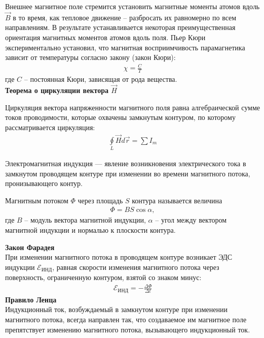 \documentclass[__minimum__.tex]{subfiles}
\begin{document}
Внешнее магнитное поле стремится установить магнитные моменты атомов вдоль $\vec{B}$ в то время, как тепловое движение – разбросать их равномерно по всем направлениям. В результате устанавливается некоторая преимущественная ориентация магнитных моментов атомов вдоль поля. Пьер Кюри экспериментально установил, что магнитная восприимчивость парамагнетика зависит от температуры согласно закону (закон Кюри):
\begin{gather*}
\chi=\frac{C}{T}
\end{gather*}
где $C$ – постоянная Кюри, зависящая от рода вещества.\\

\textbf{Теорема о циркуляции вектора $\vec{H}$}\\
\begin{theorem}
Циркуляция вектора напряженности магнитного поля равна алгебраической сумме токов проводимости, которые охвачены замкнутым контуром, по которому рассматривается циркуляция:
\begin{gather*}
\oint\limits_L \vec{H}d\vec{r}=\sum I_m
\end{gather*}
\end{theorem}

\begin{definition}
Электромагнитная индукция --- явление возникновения электрического тока в замкнутом проводящем контуре при изменении во времени магнитного потока, пронизывающего контур.
\end{definition}
\begin{definition}
Магнитным потоком $\Phi$ через площадь $S$ контура называется величина 
\begin{gather*}
\Phi = BS\cos\alpha,
\end{gather*}
где $B$ -- модуль вектора магнитной индукции, $\alpha$ -- угол между вектором магнитной индукции и нормалью к плоскости контура.
\end{definition}

\textbf{Закон Фарадея}\\
При изменении магнитного потока в проводящем контуре возникает ЭДС индукции $\mathcal E_{\text{ИНД}}$, равная скорости изменения магнитного потока через поверхность, ограниченную контуром, взятой со знаком минус:
\begin{gather*}
\mathcal E_{\text{ИНД}}=-\frac{\Delta \Phi}{\Delta t}
\end{gather*}
\textbf{Правило Ленца}\\
Индукционный ток, возбуждаемый в замкнутом контуре при изменении магнитного потока, всегда направлен так, что создаваемое им магнитное поле препятствует изменению магнитного потока, вызывающего индукционный ток.\\
\end{document}
